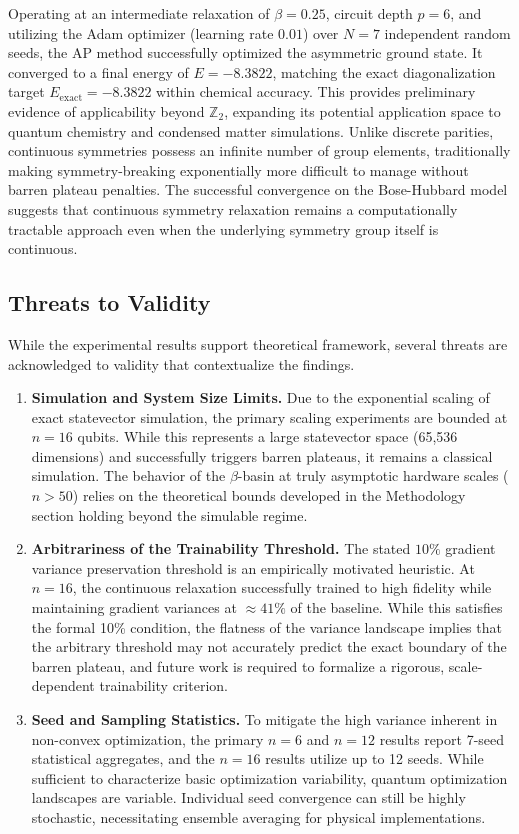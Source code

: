 \documentclass[pdflatex,sn-mathphys-num]{sn-jnl}
\theoremstyle{thmstyleone}
\theoremstyle{thmstyletwo}
\theoremstyle{thmstylethree}
\begin{document}
Operating at an intermediate relaxation of $\beta=0.25$, circuit depth $p=6$, and utilizing the Adam optimizer (learning rate $0.01$) over $N=7$ independent random seeds, the AP method successfully optimized the asymmetric ground state. It converged to a final energy of $E = -8.3822$, matching the exact diagonalization target $E_{\text{exact}} = -8.3822$ within chemical accuracy. This provides preliminary evidence of applicability beyond $\mathbb{Z}_2$, expanding its potential application space to quantum chemistry and condensed matter simulations. Unlike discrete parities, continuous symmetries possess an infinite number of group elements, traditionally making symmetry-breaking exponentially more difficult to manage without barren plateau penalties. The successful convergence on the Bose-Hubbard model suggests that continuous symmetry relaxation remains a computationally tractable approach even when the underlying symmetry group itself is continuous.

\subsection{Threats to Validity}
\label{sec:threats}

While the experimental results support theoretical framework, several threats are acknowledged to validity that contextualize the findings.
\begin{enumerate}
    \item \textbf{Simulation and System Size Limits.} Due to the exponential scaling of exact statevector simulation, the primary scaling experiments are bounded at $n=16$ qubits. While this represents a large statevector space (65,536 dimensions) and successfully triggers barren plateaus, it remains a classical simulation. The behavior of the $\beta$-basin at truly asymptotic hardware scales ($n > 50$) relies on the theoretical bounds developed in the Methodology section holding beyond the simulable regime.
    \item \textbf{Arbitrariness of the Trainability Threshold.} The stated $10\%$ gradient variance preservation threshold is an empirically motivated heuristic. At $n=16$, the continuous relaxation successfully trained to high fidelity while maintaining gradient variances at $\approx 41\%$ of the baseline. While this satisfies the formal 10\% condition, the flatness of the variance landscape implies that the arbitrary threshold may not accurately predict the exact boundary of the barren plateau, and future work is required to formalize a rigorous, scale-dependent trainability criterion.
    \item \textbf{Seed and Sampling Statistics.} To mitigate the high variance inherent in non-convex optimization, the primary $n=6$ and $n=12$ results report 7-seed statistical aggregates, and the $n=16$ results utilize up to 12 seeds. While sufficient to characterize basic optimization variability, quantum optimization landscapes are variable. Individual seed convergence can still be highly stochastic, necessitating ensemble averaging for physical implementations.
\end{enumerate}
\end{document}
